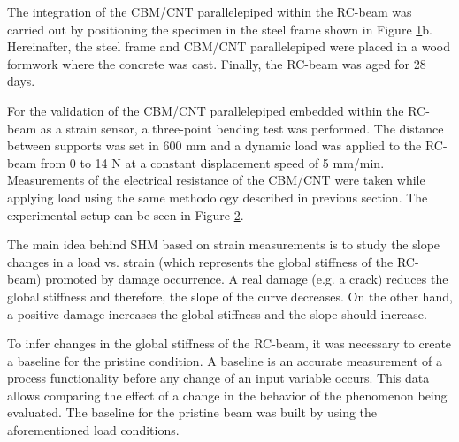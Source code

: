 \documentclass[twocolumn]{bmcart}%
\begin{document}
The integration of the CBM/CNT parallelepiped within the RC-beam was carried out by positioning the specimen in the steel frame shown in Figure \ref{fig5}b. Hereinafter, the steel frame and CBM/CNT parallelepiped were placed in a wood formwork where the concrete was cast. Finally, the RC-beam was aged for 28 days. 

\begin{figure}[h!]
  \caption{
      }
      \label{fig5}
      \end{figure}


For the validation of the CBM/CNT parallelepiped embedded within the RC-beam as a strain sensor, a three-point bending test was performed. The distance between supports was set in 600 mm and a dynamic load was applied to the RC-beam from 0 to 14 N at a constant displacement speed of 5 mm/min. Measurements of the electrical resistance of the CBM/CNT were taken while applying load using the same methodology described in previous section. The experimental setup can be seen in Figure \ref{fig6}.

The main idea behind SHM based on strain measurements is to study the slope changes in a load vs. strain (which represents the global stiffness of the RC-beam) promoted by damage occurrence. A real damage (e.g. a crack) reduces the global stiffness and therefore, the slope of the curve decreases. On the other hand, a positive damage increases the global stiffness and the slope should increase.

To infer changes in the global stiffness of the RC-beam, it was necessary to create a baseline for the pristine condition. A baseline is an accurate measurement of a process functionality before any change of an input variable occurs. This data allows comparing the effect of a change in the behavior of the phenomenon being evaluated.  The baseline for the pristine beam was built by using the aforementioned load conditions.

\begin{figure}[h!]
  \caption{
      }
      \label{fig6}
      \end{figure}
\end{document}
